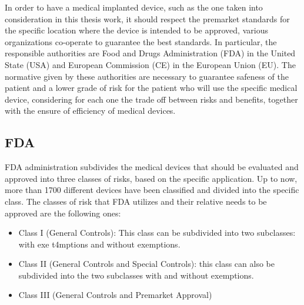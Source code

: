 \documentclass{Configuration_Files/PoliMi3i_thesis}
\begin{document}
In order to have a medical implanted device, such as the one taken into consideration in this thesis work, it should respect the premarket standards for the specific location where the device is intended to be approved, various organizations co-operate to guarantee the best standards. \cite{UWBioEUniversity2021} In particular, the responsible authorities are Food and Drugs Administration (FDA) in the United State (USA) and European Commission (CE) in the European Union (EU). 
The normative given by these authorities are necessary to guarantee safeness of the patient and a lower grade of risk for the patient who will use the specific medical device, considering for each one the trade off between risks and benefits, together with the ensure of efficiency of medical devices.

\subsection{FDA}

FDA administration subdivides the medical devices that should be evaluated and approved into three classes of risks, based on the specific application. Up to now, more than 1700 different devices have been classified and divided into the specific class. \cite{healthClassifyYourMedical2023}
The classes of risk that FDA utilizes and their relative needs to be approved are the following ones: 
\begin{itemize}

	\item  Class I (General Controls): This class can be subdivided into two subclasses: with exe        t4mptions and without exemptions.
	\item  Class II (General Controls and Special Controls): this class can also be subdivided into the two subclasses with and without exemptions.
	\item  Class III (General Controls and Premarket Approval)

\end{itemize}
\end{document}
